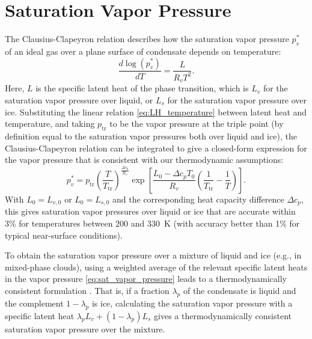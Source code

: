 \documentclass{report}
\begin{document}
\section{Saturation Vapor Pressure}

The Clausius-Clapeyron relation describes how the saturation vapor pressure $p_v^*$ of an ideal gas over a plane surface of condensate depends on temperature:
\begin{equation}\label{e:Clausius_Clapeyron}
    \frac{d \log(p_v^*)}{dT} = \frac{L}{R_v T^2}.
\end{equation}
Here, $L$ is the specific latent heat of the phase transition, which is $L_v$ for the saturation vapor pressure over liquid, or $L_s$ for the saturation vapor pressure over ice. Substituting the linear relation \eqref{eq:LH_temperature} between latent heat and temperature, and taking $p_\mathrm{tr}$ to be the vapor pressure at the triple point (by definition equal to the saturation vapor pressures both over liquid and ice), the Clausius-Clapeyron relation can be integrated to give a closed-form expression for the vapor pressure that is consistent with our thermodynamic assumptions:
\begin{equation}
    p_v^* = p_{\mathrm{tr}} \left( \frac{T}{T_{\mathrm{tr}}} \right)^{\frac{\Delta c_p}{R_v}}
        \exp \left[ \frac{L_0 - \Delta c_p T_0}{R_v} 
        \left( \frac{1}{T_{\mathrm{tr}}} - \frac{1}{T} \right) \right].
        \label{eq:sat_vapor_pressure}
\end{equation}
With $L_0 = L_{v,0}$ or $L_0 = L_{s,0}$ and the corresponding heat capacity difference $\Delta c_p$, this gives saturation vapor pressures over liquid or ice that are accurate within 3\% for temperatures between 200 and 330~K (with accuracy better than 1\% for typical near-surface conditions).

To obtain the saturation vapor pressure over a mixture of liquid and ice (e.g., in mixed-phase clouds), using a weighted average of the relevant specific latent heats in the vapor pressure \eqref{eq:sat_vapor_pressure} leads to a thermodynamically consistent formulation \citep{Pressel15a}. That is, if a fraction $\lambda_p$ of the condensate is liquid and the complement $1-\lambda_p$ is ice, calculating the saturation vapor pressure with a specific latent heat $\lambda_p L_v + (1-\lambda_p)L_s$ gives a thermodynamically consistent saturation vapor pressure over the mixture. 
\end{document}
